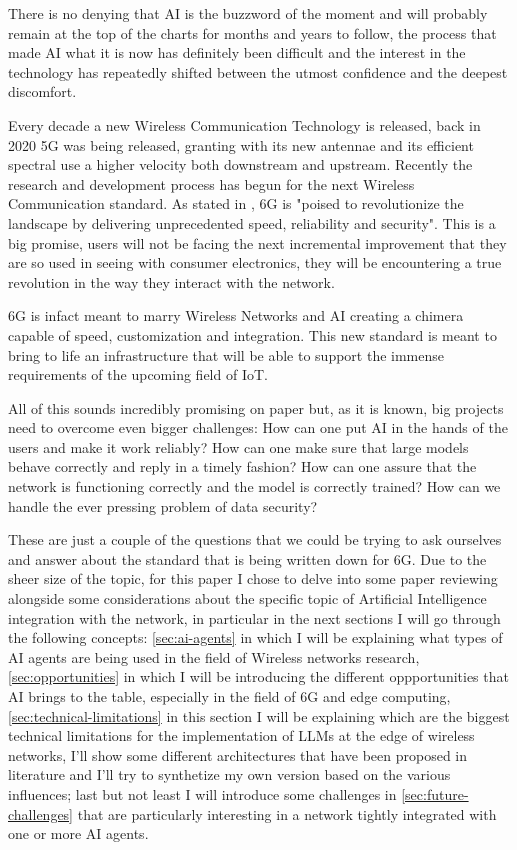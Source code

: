 

There is no denying that AI is the buzzword of the moment and will probably remain at the top of the
charts for months and years to follow, the process that made AI what it is now has definitely been difficult
and the interest in the technology has repeatedly shifted between the utmost confidence and the deepest discomfort.

Every decade a new Wireless Communication Technology is released, back in 2020 5G was being
released, granting with its new antennae and its efficient spectral use a higher velocity both downstream
and upstream. Recently the research and development process has begun for the next Wireless
Communication standard. 
As stated in \cite{6ainets}, 6G is "poised to revolutionize the landscape by delivering
unprecedented speed, reliability and security". This is a big promise, users will not be facing the
next incremental improvement that they are so used in seeing with consumer electronics, they will be
encountering a true revolution in the way they interact with the network.

6G is infact meant to marry Wireless Networks and AI creating a chimera capable of speed,
customization and integration. This new standard is meant to bring to life an infrastructure that
will be able to support the immense requirements of the upcoming field of IoT.

All of this sounds incredibly promising on paper but, as it is known, big projects need to overcome even
bigger challenges: How can one put AI in the hands of the users and make it work reliably? How can
one make sure that large models behave correctly and reply in a timely fashion? How can one
assure that the network is functioning correctly and the model is correctly trained? How can we
handle the ever pressing problem of data security?

These are just a couple of the questions that we could be trying to ask ourselves and answer about
the standard that is being written down for 6G. Due to the sheer size of the topic, for this
paper I chose to delve into some paper reviewing alongside some considerations about the specific
topic of Artificial Intelligence integration with the network, in particular in the next sections I
will go through the following concepts: \ref{sec:ai-agents} in which I will be explaining what types
of AI agents are being used in the field of Wireless networks research, \ref{sec:opportunities} in
which I will be introducing the different oppportunities that AI brings to the table, especially in
the field of 6G and edge computing, \ref{sec:technical-limitations} in this section I will be
explaining which are the biggest technical limitations for the implementation of LLMs at the edge of
wireless networks, I'll show some different architectures that have been proposed in literature and
I'll try to synthetize my own version based on the various influences; last but not least I will
introduce some challenges in \ref{sec:future-challenges} that are particularly interesting in a
network tightly integrated with one or more AI agents.
